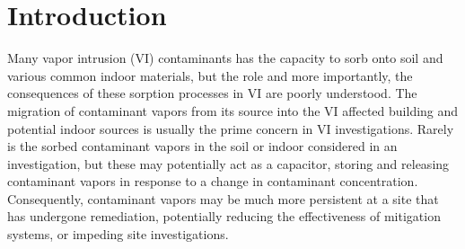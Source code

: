\begin{comment}

What is the message of the paper?

Sorbed contaminants can significantly delay changes in concentration in the indoor air and the soil-gas depending on the particular soil and/or indoor materials found.
This has consequences if one is for instance interested in mitigating or remediating a VI site as sorption may significantly impede this effort.
It also has consequences for rooting out indoor contaminant sources as:
1. Even after ventilation and/or removing potential indoor sources, there may still be contaminant vapors being released from various materials.
2. It may decrease the effectiveness of applying the CPM.

What is the new result/contribution that you want to describe?

This study presents some new sorption information for TCE and runs never-done-before simulations that investigate the potential role of sorption in VI and VI investigations.

What do you want to convince people of?

1. Take indoor materials into account and perhaps removing or covering up exposed materials that have a high sorption capacity.
2. Take it into consideration that contaminants vapors may emanate from soils for a long time, since they potentially have such a large sorption capacity - almost acting a source in of themselves. E.g. that remediation or mitigation effort may be impeded by this.
3. Perhaps desorbing soil/indoor material samples to determine how significant sorption might be warranted.

\end{comment}

\section{Introduction}\label{sec:intro}

Many vapor intrusion (VI) contaminants has the capacity to sorb onto soil and various common indoor materials, but the role and more importantly, the consequences of these sorption processes in VI are poorly understood\cite{meininghaus_diffusion_2000,meininghaus_diffusion_2002,tillman_review_2005}.
The migration of contaminant vapors from its source into the VI affected building and potential indoor sources is usually the prime concern in VI investigations.
Rarely is the sorbed contaminant vapors in the soil or indoor considered in an investigation, but these may potentially act as a capacitor, storing and releasing contaminant vapors in response to a change in contaminant concentration.
Consequently, contaminant vapors may be much more persistent at a site that has undergone remediation, potentially reducing the effectiveness of mitigation systems, or impeding site investigations.\par

